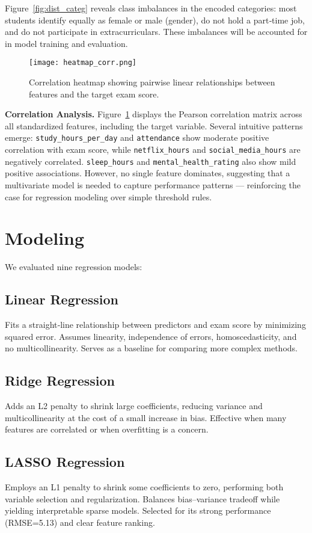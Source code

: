 \documentclass[conference]{IEEEtran}
\begin{document}
Figure~\ref{fig:dist_categ} reveals class imbalances in the encoded categories: most students identify equally as female or male (gender), do not hold a part‐time job, and do not participate in extracurriculars. These imbalances will be accounted for in model training and evaluation.

\begin{figure}[htbp]
  \centering
  \texttt{[image: heatmap\_corr.png]}
  \caption{Correlation heatmap showing pairwise linear relationships between features and the target exam score.}
  \label{fig:heatmap}
\end{figure}

\noindent\textbf{Correlation Analysis.}
Figure~\ref{fig:heatmap} displays the Pearson correlation matrix across all standardized features, including the target variable. Several intuitive patterns emerge: \texttt{study\_hours\_per\_day} and \texttt{attendance} show moderate positive correlation with exam score, while \texttt{netflix\_hours} and \texttt{social\_media\_hours} are negatively correlated. \texttt{sleep\_hours} and \texttt{mental\_health\_rating} also show mild positive associations. However, no single feature dominates, suggesting that a multivariate model is needed to capture performance patterns — reinforcing the case for regression modeling over simple threshold rules.


\section{Modeling}
We evaluated nine regression models:

\subsection{Linear Regression}
Fits a straight‐line relationship between predictors and exam score by minimizing squared error. Assumes linearity, independence of errors, homoscedasticity, and no multicollinearity. Serves as a baseline for comparing more complex methods.

\subsection{Ridge Regression}
Adds an L2 penalty to shrink large coefficients, reducing variance and multicollinearity at the cost of a small increase in bias. Effective when many features are correlated or when overfitting is a concern.

\subsection{LASSO Regression}
Employs an L1 penalty to shrink some coefficients to zero, performing both variable selection and regularization. Balances bias–variance tradeoff while yielding interpretable sparse models. Selected for its strong performance (RMSE=5.13) and clear feature ranking.
\end{document}
